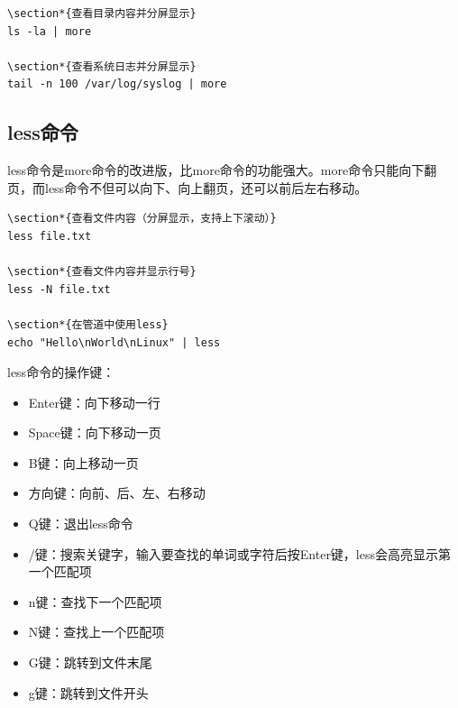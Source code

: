 \documentclass[12pt,UTF8]{ctexbook}
\begin{document}
\begin{verbatim}
\section*{查看目录内容并分屏显示}
ls -la | more

\section*{查看系统日志并分屏显示}
tail -n 100 /var/log/syslog | more
\end{verbatim}

\subsection{less命令}
less命令是more命令的改进版，比more命令的功能强大。more命令只能向下翻页，而less命令不但可以向下、向上翻页，还可以前后左右移动。

\begin{verbatim}
\section*{查看文件内容（分屏显示，支持上下滚动）}
less file.txt

\section*{查看文件内容并显示行号}
less -N file.txt

\section*{在管道中使用less}
echo "Hello\nWorld\nLinux" | less
\end{verbatim}

less命令的操作键：
\begin{itemize}
    \item Enter键：向下移动一行
    \item Space键：向下移动一页
    \item B键：向上移动一页
    \item 方向键：向前、后、左、右移动
    \item Q键：退出less命令
    \item /键：搜索关键字，输入要查找的单词或字符后按Enter键，less会高亮显示第一个匹配项
    \item n键：查找下一个匹配项
    \item N键：查找上一个匹配项
    \item G键：跳转到文件末尾
    \item g键：跳转到文件开头
\end{itemize}
\end{document}
